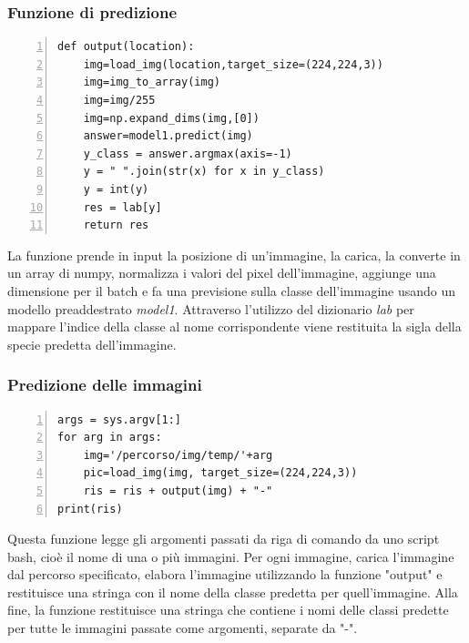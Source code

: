 \documentclass[a4paper,final,12pt]{report}
\begin{document}
\subsubsection{Funzione di predizione}
\begin{lstlisting}[caption={Codice della funzione di predizione.}, label={lst:funzione_predizione}, breaklines, escapechar=`\%, frame=lines, basicstyle=\small\ttfamily, keepspaces=true, numbers=left]
def output(location):
    img=load_img(location,target_size=(224,224,3))
    img=img_to_array(img)
    img=img/255
    img=np.expand_dims(img,[0])
    answer=model1.predict(img)
    y_class = answer.argmax(axis=-1)
    y = " ".join(str(x) for x in y_class)
    y = int(y)
    res = lab[y]
    return res
\end{lstlisting}
La funzione prende in input la posizione di un'immagine, la carica, la converte in un array di numpy, normalizza i valori del pixel dell'immagine, aggiunge una dimensione per il batch e fa una previsione sulla classe dell'immagine usando un modello preaddestrato \textit{model1}. Attraverso l'utilizzo del dizionario \textit{lab} per mappare l'indice della classe al nome corrispondente viene restituita la sigla della specie predetta dell'immagine.

\subsubsection{Predizione delle immagini}
\begin{lstlisting}[caption={Codice della predizione delle immagini.}, label={lst:Immagini_predizione}, breaklines, escapechar=`\%, frame=lines, basicstyle=\small\ttfamily, keepspaces=true, numbers=left]
args = sys.argv[1:]
for arg in args:
    img='/percorso/img/temp/'+arg
    pic=load_img(img, target_size=(224,224,3))
    ris = ris + output(img) + "-"
print(ris)
\end{lstlisting}
Questa funzione legge gli argomenti passati da riga di comando da uno script bash, cioè il nome di una o più immagini. Per ogni immagine, carica l'immagine dal percorso specificato, elabora l'immagine utilizzando la funzione "output" e restituisce una stringa con il nome della classe predetta per quell'immagine. Alla fine, la funzione restituisce una stringa che contiene i nomi delle classi predette per tutte le immagini passate come argomenti, separate da "-".
\end{document}
